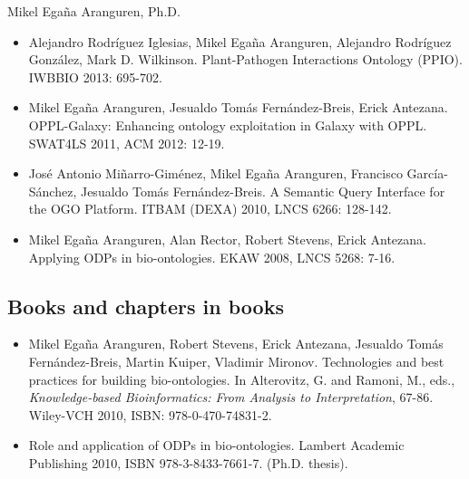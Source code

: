 \documentclass[english,11pt,a4paper,oneside]{article}
\newcommand{\todo}[1]{\textbf{{\color{blue}$\Longrightarrow$ #1}}}
\begin{document}
\begin{cv}{Mikel Ega\~na Aranguren, Ph.D. }
\begin{itemize}
	\item Alejandro Rodr\'iguez Iglesias, Mikel Ega\~na Aranguren, Alejandro Rodr\'iguez Gonz\'alez, Mark D. Wilkinson. Plant-Pathogen Interactions Ontology (PPIO). IWBBIO 2013: 695-702.
	
	\item Mikel Ega\~na Aranguren, Jesualdo Tom\'as Fern\'andez-Breis, Erick Antezana. OPPL-Galaxy: Enhancing ontology exploitation in Galaxy with OPPL. SWA\-T\-4LS 2011, ACM 2012: 12-19.

	\item Jos\'e Antonio Mi\~narro-Gim\'enez, Mikel Ega\~na Aranguren, Francisco Garc\'ia-S\'anchez, Jesualdo Tom\'as Fern\'andez-Breis. A Semantic Query Interface for the OGO Platform. ITBAM (DEXA) 2010, LNCS 6266: 128-142.

	\item Mikel Ega\~na Aranguren, Alan Rector, Robert Stevens, Erick Antezana. Applying ODPs in bio-ontologies. EKAW 2008, LNCS 5268: 7-16.
\end{itemize}

\subsection*{Books and chapters in books}

\begin{itemize}




% 	




	\item Mikel Ega\~na Aranguren, Robert Stevens, Erick Antezana, Jesualdo Tom\'as Fern\'andez-Breis, Martin Kuiper, Vladimir Mironov. Technologies and best practices for building bio-ontologies. In Alterovitz, G. and Ramoni, M., eds., \textit{Knowledge-based Bioinformatics: From Analysis to Interpretation}, 67-86. Wiley-VCH 2010, ISBN: 978-0-470-74831-2. 

	\item Role and application of ODPs in bio-ontologies. Lambert Academic Publishing 2010, ISBN 978-3-8433-7661-7. (Ph.D. thesis).
\end{itemize}


\end{cv}
\end{document}
